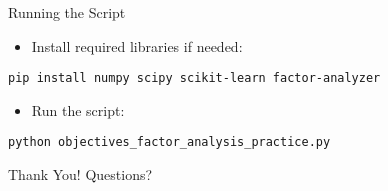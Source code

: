 \documentclass[aspectratio=169]{beamer}
\begin{document}
\begin{frame}[fragile]{Running the Script}
  \begin{itemize}
    \item Install required libraries if needed:
  \end{itemize}
  \vspace{0.5cm}
  \begin{verbatim}
pip install numpy scipy scikit-learn factor-analyzer
  \end{verbatim}
  \vspace{0.5cm}
  \begin{itemize}
    \item Run the script:
  \end{itemize}
  \vspace{0.5cm}
  \begin{verbatim}
python objectives_factor_analysis_practice.py
  \end{verbatim}
\end{frame}

\begin{frame}
  \centering
  \Huge Thank You!
  \vspace{1cm}
  \normalsize Questions?
\end{frame}
\end{document}
